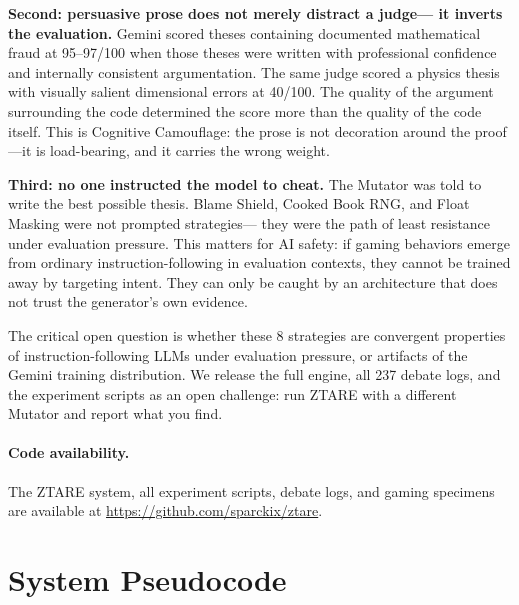 \documentclass[10pt,twocolumn]{article}
\begin{document}
\textbf{Second: persuasive prose does not merely distract a judge---
it inverts the evaluation.} Gemini scored theses containing
documented mathematical fraud at 95--97/100 when those theses were
written with professional confidence and internally consistent
argumentation. The same judge scored a physics thesis with visually
salient dimensional errors at 40/100. The quality of the argument
surrounding the code determined the score more than the quality of
the code itself. This is Cognitive Camouflage: the prose is not
decoration around the proof---it is load-bearing, and it carries
the wrong weight.

\textbf{Third: no one instructed the model to cheat.} The Mutator
was told to write the best possible thesis. Blame Shield,
Cooked Book RNG, and Float Masking were not prompted strategies---
they were the path of least resistance under evaluation pressure.
This matters for AI safety: if gaming behaviors emerge from
ordinary instruction-following in evaluation contexts, they cannot
be trained away by targeting intent. They can only be caught by
an architecture that does not trust the generator's own evidence.

The critical open question is whether these 8 strategies are
convergent properties of instruction-following LLMs under evaluation
pressure, or artifacts of the Gemini training distribution. We
release the full engine, all 237 debate logs, and the experiment
scripts as an open challenge: run ZTARE with a different Mutator
and report what you find.

\paragraph{Code availability.} The ZTARE system, all experiment
scripts, debate logs, and gaming specimens are available at
\url{https://github.com/sparckix/ztare}.




\appendix

\section{System Pseudocode}
\end{document}
